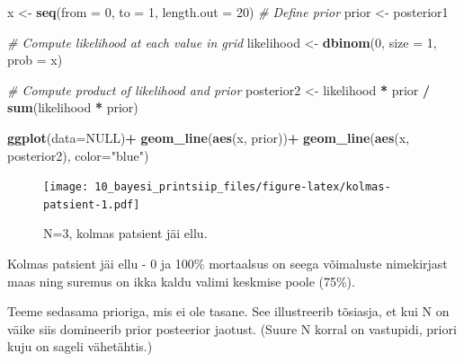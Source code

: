 \documentclass[]{book}
\newenvironment{Shaded}{\begin{snugshade}}{\end{snugshade}}
\newcommand{\CommentTok}[1]{\textcolor[rgb]{0.56,0.35,0.01}{\textit{#1}}}
\newcommand{\DataTypeTok}[1]{\textcolor[rgb]{0.13,0.29,0.53}{#1}}
\newcommand{\DecValTok}[1]{\textcolor[rgb]{0.00,0.00,0.81}{#1}}
\newcommand{\KeywordTok}[1]{\textcolor[rgb]{0.13,0.29,0.53}{\textbf{#1}}}
\newcommand{\NormalTok}[1]{#1}
\newcommand{\OperatorTok}[1]{\textcolor[rgb]{0.81,0.36,0.00}{\textbf{#1}}}
\newcommand{\OtherTok}[1]{\textcolor[rgb]{0.56,0.35,0.01}{#1}}
\newcommand{\StringTok}[1]{\textcolor[rgb]{0.31,0.60,0.02}{#1}}
\begin{document}
\begin{Shaded}
\begin{Highlighting}[]
\NormalTok{x <-}\StringTok{ }\KeywordTok{seq}\NormalTok{(}\DataTypeTok{from =} \DecValTok{0}\NormalTok{, }\DataTypeTok{to =} \DecValTok{1}\NormalTok{, }\DataTypeTok{length.out =} \DecValTok{20}\NormalTok{)}
\CommentTok{# Define prior}
\NormalTok{prior <-}\StringTok{ }\NormalTok{posterior1}

\CommentTok{# Compute likelihood at each value in grid}
\NormalTok{likelihood <-}\StringTok{ }\KeywordTok{dbinom}\NormalTok{(}\DecValTok{0}\NormalTok{, }\DataTypeTok{size =} \DecValTok{1}\NormalTok{, }\DataTypeTok{prob =}\NormalTok{ x)}

\CommentTok{# Compute product of likelihood and prior}
\NormalTok{posterior2 <-}\StringTok{ }\NormalTok{likelihood }\OperatorTok{*}\StringTok{ }\NormalTok{prior }\OperatorTok{/}\StringTok{ }\KeywordTok{sum}\NormalTok{(likelihood }\OperatorTok{*}\StringTok{ }\NormalTok{prior)}

\KeywordTok{ggplot}\NormalTok{(}\DataTypeTok{data=}\OtherTok{NULL}\NormalTok{)}\OperatorTok{+}
\StringTok{  }\KeywordTok{geom_line}\NormalTok{(}\KeywordTok{aes}\NormalTok{(x, prior))}\OperatorTok{+}
\StringTok{  }\KeywordTok{geom_line}\NormalTok{(}\KeywordTok{aes}\NormalTok{(x, posterior2), }\DataTypeTok{color=}\StringTok{"blue"}\NormalTok{)}
\end{Highlighting}
\end{Shaded}

\begin{figure}
\centering
\texttt{[image: 10\_bayesi\_printsiip\_files/figure-latex/kolmas-patsient-1.pdf]}
\caption{\label{fig:kolmas-patsient}N=3, kolmas patsient jäi ellu.}
\end{figure}

Kolmas patsient jäi ellu - 0 ja 100\% mortaalsus on seega võimaluste nimekirjast maas ning suremus on ikka kaldu valimi keskmise poole (75\%).

Teeme sedasama prioriga, mis ei ole tasane. See illustreerib tõsiasja, et kui N on väike siis domineerib prior posteerior jaotust. (Suure N korral on vastupidi, priori kuju on sageli vähetähtis.)
\end{document}
